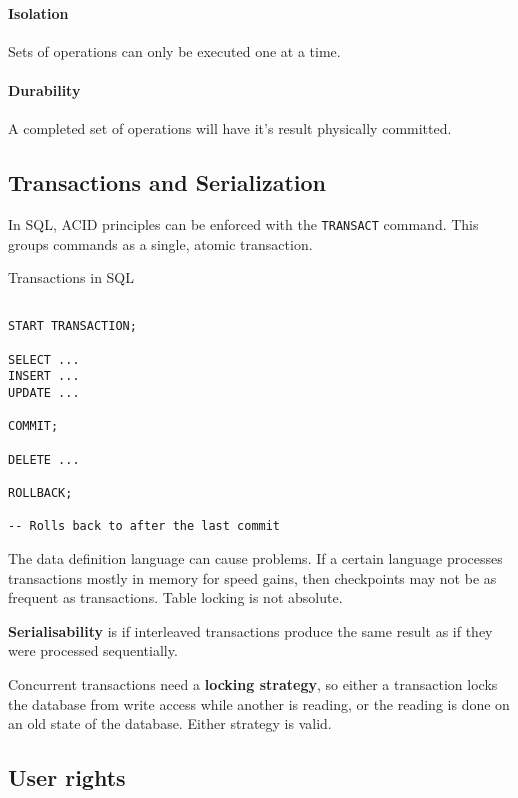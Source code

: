 \paragraph{Isolation} Sets of operations can only be executed one at a time.

\paragraph{Durability} A completed set of operations will have it's result physically committed.

\subsection{Transactions and Serialization}

In SQL, ACID principles can be enforced with the \texttt{TRANSACT} command. This groups commands as a single, atomic transaction.

\begin{listing}[H]
\caption{Transactions in SQL}
\label{lis:transaction}
\begin{verbatim}

START TRANSACTION;

SELECT ...
INSERT ... 
UPDATE ... 

COMMIT;

DELETE ...

ROLLBACK;

-- Rolls back to after the last commit

	\end{verbatim}
\end{listing}

The data definition language can cause problems. If a certain language processes transactions mostly in memory for speed gains, then checkpoints may not be as frequent as transactions. Table locking is not absolute.

\textbf{Serialisability} is if interleaved transactions produce the same result as if they were processed sequentially. 

Concurrent transactions need a \textbf{locking strategy}, so either a transaction locks the database from write access while another is reading, or the reading is done on an old state of the database. Either strategy is valid.

\subsection{User rights}

